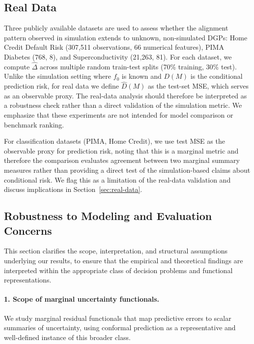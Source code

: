 \documentclass[pdflatex,sn-mathphys-ay]{sn-jnl}%
\theoremstyle{thmstyleone}%
\theoremstyle{thmstyletwo}%
\theoremstyle{thmstylethree}%
\begin{document}
\subsection{Real Data}
\label{sec:real-data-design}

Three publicly available datasets are used to assess whether the alignment pattern observed in simulation extends to unknown, non-simulated DGPs: Home Credit Default Risk (307,511 observations, 66 numerical features), PIMA Diabetes (768, 8), and Superconductivity (21,263, 81). For each dataset, we compute $\hat{\Delta}$ across multiple random train-test splits (70\% training, 30\% test). Unlike the simulation setting where $f_0$ is known and $D(M)$ is the conditional prediction risk, for real data we define $\hat{D}(M)$ as the test-set MSE, which serves as an observable proxy. The real-data analysis should therefore be interpreted as a robustness check rather than a direct validation of the simulation metric. We emphasize that these experiments are not intended for model comparison or benchmark ranking.

For classification datasets (PIMA, Home Credit), we use test MSE as the observable proxy for prediction risk, noting that this is a marginal metric and therefore the comparison evaluates agreement between two marginal summary measures rather than providing a direct test of the simulation-based claims about conditional risk. We flag this as a limitation of the real-data validation and discuss implications in Section~\ref{sec:real-data}.

\subsection*{Robustness to Modeling and Evaluation Concerns}

This section clarifies the scope, interpretation, and structural assumptions underlying our results, to ensure that the empirical and theoretical findings are interpreted within the appropriate class of decision problems and functional representations.

\paragraph{1. Scope of marginal uncertainty functionals.}
We study marginal residual functionals that map predictive errors to scalar summaries of uncertainty, using conformal prediction as a representative and well-defined instance of this broader class.
\end{document}
